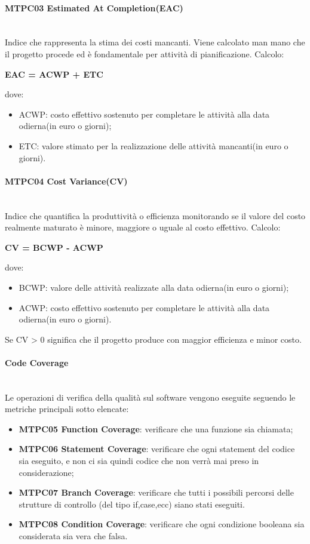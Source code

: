 \paragraph{MTPC03 Estimated At Completion(EAC)}\-\\
Indice che rappresenta la stima dei costi mancanti. Viene calcolato man mano che il progetto procede ed è fondamentale per attività di pianificazione.
Calcolo:
\begin{center}
	\item \textbf{EAC = ACWP + ETC}
\end{center}
dove:
\begin{itemize}
	\item ACWP: costo effettivo sostenuto per completare le attività alla data odierna(in euro o giorni);
	\item ETC: valore stimato per la realizzazione delle attività mancanti(in euro o giorni).
\end{itemize}

\paragraph{MTPC04 Cost Variance(CV)}\-\\
Indice che quantifica la produttività o efficienza monitorando se il valore del costo realmente maturato è minore, maggiore o uguale al costo effettivo.
Calcolo:
\begin{center}
	\item \textbf{CV = BCWP - ACWP}
\end{center}
dove:
\begin{itemize}
	\item BCWP: valore delle attività realizzate alla data odierna(in euro o giorni);
	\item ACWP: costo effettivo sostenuto per completare le attività alla data odierna(in euro o giorni).
\end{itemize}
Se CV > 0 significa che il progetto produce con maggior efficienza e minor costo.

\paragraph{Code Coverage}\-\\
Le operazioni di verifica della qualità sul software vengono eseguite seguendo le metriche principali sotto elencate:
\begin{itemize}
	\item \textbf{MTPC05 Function Coverage}: verificare che una funzione sia chiamata;
	\item \textbf{MTPC06 Statement Coverage}: verificare che ogni statement del codice sia eseguito, e non ci sia quindi codice che non verrà mai preso in considerazione;
	\item \textbf{MTPC07 Branch Coverage}: verificare che tutti i possibili percorsi delle strutture di controllo (del tipo if,case,ecc) siano stati eseguiti.
	\item \textbf{MTPC08 Condition Coverage}: verificare che ogni condizione booleana sia considerata sia vera che falsa.
\end{itemize}

